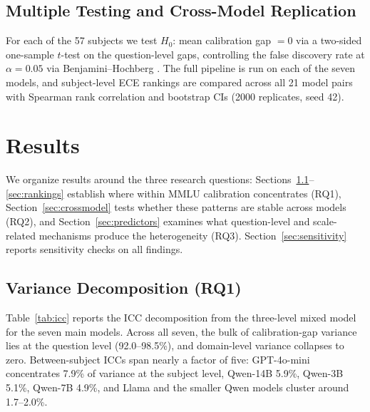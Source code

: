 \documentclass[11pt]{article}
\begin{document}
\subsection{Multiple Testing and Cross-Model Replication}

For each of the 57 subjects we test $H_0$: mean calibration gap $= 0$ via a
two-sided one-sample $t$-test on the question-level gaps, controlling the
false discovery rate at $\alpha=0.05$ via Benjamini--Hochberg \citep{bh1995}.
The full pipeline is run on each of the seven models, and subject-level ECE
rankings are compared across all 21 model pairs with Spearman rank correlation
and bootstrap CIs (2000 replicates, seed 42).

\section{Results}

We organize results around the three research questions: Sections~\ref{sec:icc}--\ref{sec:rankings}
establish where within MMLU calibration concentrates (RQ1), Section~\ref{sec:crossmodel}
tests whether these patterns are stable across models (RQ2), and Section~\ref{sec:predictors}
examines what question-level and scale-related mechanisms produce the heterogeneity (RQ3).
Section~\ref{sec:sensitivity} reports sensitivity checks on all findings.

\subsection{Variance Decomposition (RQ1)}
\label{sec:icc}

Table~\ref{tab:icc} reports the ICC decomposition from the three-level mixed
model for the seven main models. Across all seven, the bulk of calibration-gap
variance lies at the question level (92.0--98.5\%), and domain-level variance
collapses to zero. Between-subject ICCs span nearly a factor of five:
GPT-4o-mini concentrates 7.9\% of variance at the subject level, Qwen-14B 5.9\%,
Qwen-3B 5.1\%, Qwen-7B 4.9\%, and Llama and the smaller Qwen models cluster
around 1.7--2.0\%.
\end{document}
